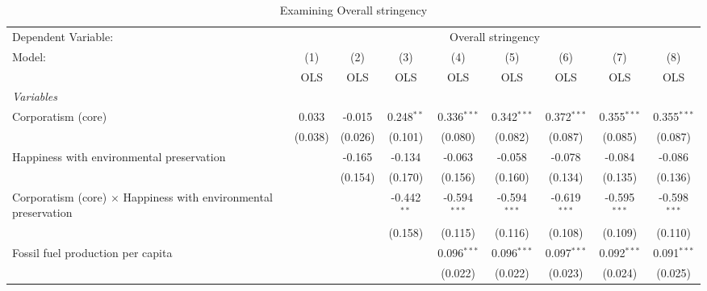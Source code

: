 
\begin{table}[htbp]
   \caption{Examining Overall stringency}
   \centering
   \begin{tabular}{lcccccccc}
      \toprule
      Dependent Variable: & \multicolumn{8}{c}{Overall stringency}\\
      Model:                                                                 & (1)     & (2)     & (3)           & (4)            & (5)            & (6)            & (7)            & (8)\\  
                                                                             &  OLS    & OLS     & OLS           & OLS            & OLS            & OLS            & OLS            & OLS\\  
      \midrule
      \emph{Variables}\\
      Corporatism (core)                                                     & 0.033   & -0.015  & 0.248$^{**}$  & 0.336$^{***}$  & 0.342$^{***}$  & 0.372$^{***}$  & 0.355$^{***}$  & 0.355$^{***}$\\   
                                                                             & (0.038) & (0.026) & (0.101)       & (0.080)        & (0.082)        & (0.087)        & (0.085)        & (0.087)\\   
      Happiness with environmental preservation                              &         & -0.165  & -0.134        & -0.063         & -0.058         & -0.078         & -0.084         & -0.086\\   
                                                                             &         & (0.154) & (0.170)       & (0.156)        & (0.160)        & (0.134)        & (0.135)        & (0.136)\\   
      Corporatism (core) $\times$ Happiness with environmental preservation  &         &         & -0.442$^{**}$ & -0.594$^{***}$ & -0.594$^{***}$ & -0.619$^{***}$ & -0.595$^{***}$ & -0.598$^{***}$\\   
                                                                             &         &         & (0.158)       & (0.115)        & (0.116)        & (0.108)        & (0.109)        & (0.110)\\   
      Fossil fuel production per capita                                      &         &         &               & 0.096$^{***}$  & 0.096$^{***}$  & 0.097$^{***}$  & 0.092$^{***}$  & 0.091$^{***}$\\   
                                                                             &         &         &               & (0.022)        & (0.022)        & (0.023)        & (0.024)        & (0.025)\\   

\end{tabular}
\end{table}
